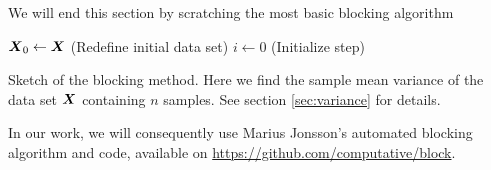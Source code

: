 We will end this section by scratching the most basic blocking algorithm

\IncMargin{1em}
\begin{algorithm}
	\SetAlgoLined
	\BlankLine
	$\boldsymbol{{X}}_0\leftarrow \boldsymbol{{X}}$ (Redefine initial data set)\;
	$i\leftarrow 0$ (Initialize step)\;
	\caption{Sketch of the blocking method. Here we find the sample mean variance of the data set $\boldsymbol{{X}}$ containing $n$ samples. See section \ref{sec:variance} for details.}
	\label{alg:blocking}
\end{algorithm}\DecMargin{1em}

In our work, we will consequently use Marius Jonsson's automated blocking algorithm and code, available on \url{https://github.com/computative/block}.

